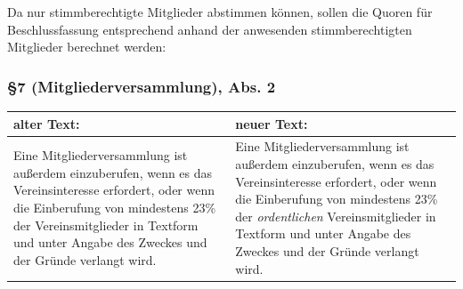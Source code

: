 \documentclass[a4paper,12pt]{scrartcl}
\begin{document}
Da nur stimmberechtigte Mitglieder abstimmen können, sollen die Quoren für
Beschlussfassung entsprechend anhand der anwesenden stimmberechtigten Mitglieder
berechnet werden:

\subsubsection*{§7 (Mitgliederversammlung), Abs. 2}
\begin{longtable}[c]{@{}ll@{}}
\toprule
\begin{minipage}[b]{0.47\columnwidth}\raggedright\strut
alter Text:
\strut\end{minipage} &
\begin{minipage}[b]{0.47\columnwidth}\raggedright\strut
neuer Text:
\strut\end{minipage}\tabularnewline
\midrule
\endhead
\begin{minipage}[t]{0.47\columnwidth}\raggedright\strut
Eine Mitgliederversammlung ist außerdem einzuberufen, wenn es das
Vereinsinteresse erfordert, oder wenn die Einberufung von mindestens
23\% der Vereinsmitglieder in Textform und unter Angabe des Zweckes und
der Gründe verlangt wird.
\strut\end{minipage} &
\begin{minipage}[t]{0.47\columnwidth}\raggedright\strut
Eine Mitgliederversammlung ist außerdem einzuberufen, wenn es das
Vereinsinteresse erfordert, oder wenn die Einberufung von mindestens
23\% der \emph{ordentlichen} Vereinsmitglieder in Textform und unter Angabe des
Zweckes und der Gründe verlangt wird.
\strut\end{minipage}\tabularnewline
\bottomrule
\end{longtable}
\end{document}
